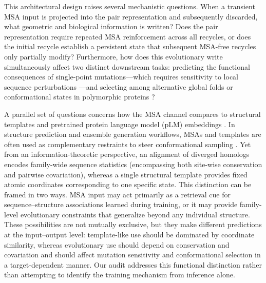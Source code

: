 \documentclass[10pt,a4paper]{article}
\begin{document}
This architectural design raises several mechanistic questions. When a transient MSA input is projected into the pair representation and subsequently discarded, what geometric and biological information is written? Does the pair representation require repeated MSA reinforcement across all recycles, or does the initial recycle establish a persistent state that subsequent MSA-free recycles only partially modify? Furthermore, how does this evolutionary write simultaneously affect two distinct downstream tasks: predicting the functional consequences of single-point mutations---which requires sensitivity to local sequence perturbations \citep{starr2020deep,notin2022tranception,notin2023proteingym}---and selecting among alternative global folds or conformational states in polymorphic proteins \citep{porter2018extant,chakravarty2022alphafold2,wayment2024predicting,chakravarty2024alphafold}?

A parallel set of questions concerns how the MSA channel compares to structural templates and pretrained protein language model (pLM) embeddings \citep{lin2023evolutionary,hayes2025simulating}. In structure prediction and ensemble generation workflows, MSAs and templates are often used as complementary restraints to steer conformational sampling \citep{del2022sampling,stein2022speach,sala2023biasing,heo2022multi,kalakoti2025afsample2}. Yet from an information-theoretic perspective, an alignment of diverged homologs encodes family-wide sequence statistics (encompassing both site-wise conservation and pairwise covariation), whereas a single structural template provides fixed atomic coordinates corresponding to one specific state. This distinction can be framed in two ways. MSA input may act primarily as a retrieval cue for sequence--structure associations learned during training, or it may provide family-level evolutionary constraints that generalize beyond any individual structure. These possibilities are not mutually exclusive, but they make different predictions at the input--output level: template-like use should be dominated by coordinate similarity, whereas evolutionary use should depend on conservation and covariation and should affect mutation sensitivity and conformational selection in a target-dependent manner. Our audit addresses this functional distinction rather than attempting to identify the training mechanism from inference alone.
\end{document}
